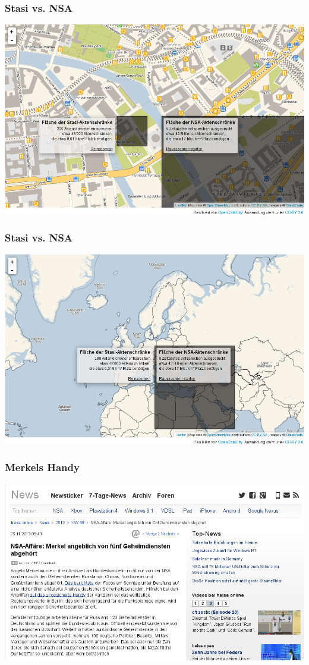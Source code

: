 \documentclass[12pt]{beamer}
\begin{document}
\begin{frame}
    \frametitle{Stasi vs. NSA}
    \includegraphics[height=0.7\textheight]{img/akten1.png}
\end{frame}

\begin{frame}
    \frametitle{Stasi vs. NSA}
    \includegraphics[height=0.7\textheight]{img/akten2.png}
\end{frame}

\begin{frame}
    \frametitle{Merkels Handy}
    \includegraphics[height=0.7\textheight]{img/heise-merkel.png}
\end{frame}
\end{document}
